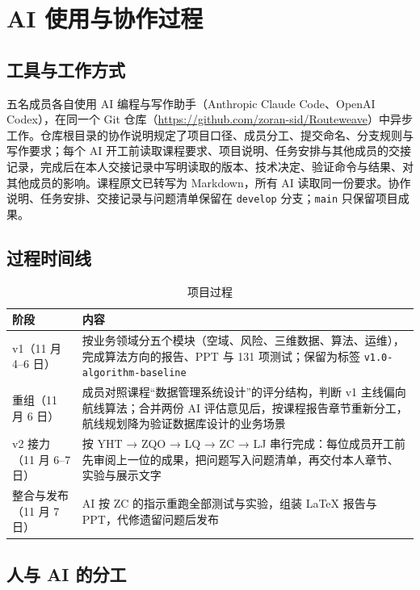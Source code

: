 \documentclass[a4paper,11pt,UTF8]{ctexart}
\begin{document}
\section{AI 使用与协作过程}\label{app:ai}

\subsection{工具与工作方式}

五名成员各自使用 AI 编程与写作助手（Anthropic Claude Code、OpenAI Codex），在同一个 Git 仓库（\url{https://github.com/zoran-sid/Routeweave}）中异步工作。仓库根目录的协作说明规定了项目口径、成员分工、提交命名、分支规则与写作要求；每个 AI 开工前读取课程要求、项目说明、任务安排与其他成员的交接记录，完成后在本人交接记录中写明读取的版本、技术决定、验证命令与结果、对其他成员的影响。课程原文已转写为 Markdown，所有 AI 读取同一份要求。协作说明、任务安排、交接记录与问题清单保留在 \texttt{develop} 分支；\texttt{main} 只保留项目成果。

\subsection{过程时间线}

\begin{table}[H]\centering\small
\caption{项目过程}
\begin{tabularx}{\textwidth}{L{2.4cm}Y}
\toprule
阶段 & 内容 \\
\midrule
v1（11 月 4–6 日） & 按业务领域分五个模块（空域、风险、三维数据、算法、运维），完成算法方向的报告、PPT 与 131 项测试；保留为标签 \texttt{v1.0-algorithm-baseline} \\
重组（11 月 6 日） & 成员对照课程“数据管理系统设计”的评分结构，判断 v1 主线偏向航线算法；合并两份 AI 评估意见后，按课程报告章节重新分工，航线规划降为验证数据库设计的业务场景 \\
v2 接力（11 月 6–7 日） & 按 YHT → ZQO → LQ → ZC → LJ 串行完成：每位成员开工前先审阅上一位的成果，把问题写入问题清单，再交付本人章节、实验与展示文字 \\
整合与发布（11 月 7 日） & AI 按 ZC 的指示重跑全部测试与实验，组装 LaTeX 报告与 PPT，代修遗留问题后发布 \\
\bottomrule
\end{tabularx}
\end{table}

\subsection{人与 AI 的分工}
\end{document}
